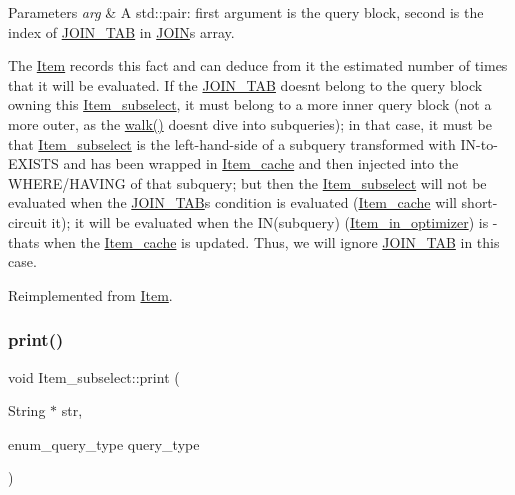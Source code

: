 \begin{DoxyParams}{Parameters}
{\em arg} & A std\+::pair\+: first argument is the query block, second is the index of \mbox{\hyperlink{classJOIN__TAB}{J\+O\+I\+N\+\_\+\+T\+AB}} in \mbox{\hyperlink{classJOIN}{J\+O\+IN}}\textquotesingle{}s array.\\
\hline
\end{DoxyParams}
The \mbox{\hyperlink{classItem}{Item}} records this fact and can deduce from it the estimated number of times that it will be evaluated. If the \mbox{\hyperlink{classJOIN__TAB}{J\+O\+I\+N\+\_\+\+T\+AB}} doesn\textquotesingle{}t belong to the query block owning this \mbox{\hyperlink{classItem__subselect}{Item\+\_\+subselect}}, it must belong to a more inner query block (not a more outer, as the \mbox{\hyperlink{classItem__subselect_a163a5d1a04b9bf04d352aca85c084adf}{walk()}} doesn\textquotesingle{}t dive into subqueries); in that case, it must be that \mbox{\hyperlink{classItem__subselect}{Item\+\_\+subselect}} is the left-\/hand-\/side of a subquery transformed with IN-\/to-\/E\+X\+I\+S\+TS and has been wrapped in \mbox{\hyperlink{classItem__cache}{Item\+\_\+cache}} and then injected into the W\+H\+E\+R\+E/\+H\+A\+V\+I\+NG of that subquery; but then the \mbox{\hyperlink{classItem__subselect}{Item\+\_\+subselect}} will not be evaluated when the \mbox{\hyperlink{classJOIN__TAB}{J\+O\+I\+N\+\_\+\+T\+AB}}\textquotesingle{}s condition is evaluated (\mbox{\hyperlink{classItem__cache}{Item\+\_\+cache}} will short-\/circuit it); it will be evaluated when the I\+N(subquery) (\mbox{\hyperlink{classItem__in__optimizer}{Item\+\_\+in\+\_\+optimizer}}) is -\/ that\textquotesingle{}s when the \mbox{\hyperlink{classItem__cache}{Item\+\_\+cache}} is updated. Thus, we will ignore \mbox{\hyperlink{classJOIN__TAB}{J\+O\+I\+N\+\_\+\+T\+AB}} in this case. 

Reimplemented from \mbox{\hyperlink{classItem}{Item}}.

\mbox{\label{classItem__subselect_a61f70e7dc36e3aad77919971995cccb9}} 
\subsubsection{\texorpdfstring{print()}{print()}}
{\footnotesize\ttfamily void Item\+\_\+subselect\+::print (\begin{DoxyParamCaption}\item[{String $\ast$}]{str,  }\item[{enum\+\_\+query\+\_\+type}]{query\+\_\+type }\end{DoxyParamCaption})\hspace{0.3cm}{\ttfamily [virtual]}}

